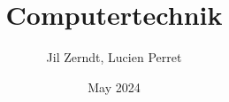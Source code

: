 \documentclass[a4paper, fontsize = 8pt, landscape]{scrartcl}
\title{Computertechnik}
\author{Jil Zerndt, Lucien Perret}
\date{May 2024}
\begin{document}
\begin{multicols}{3}
	\thispagestyle{TitlePageStyle}
	\maketitle
	
	
	
	
	
	
	
	
	
	
	
	
	\raggedcolumns
	\pagebreak
	
\end{multicols}
\end{document}
